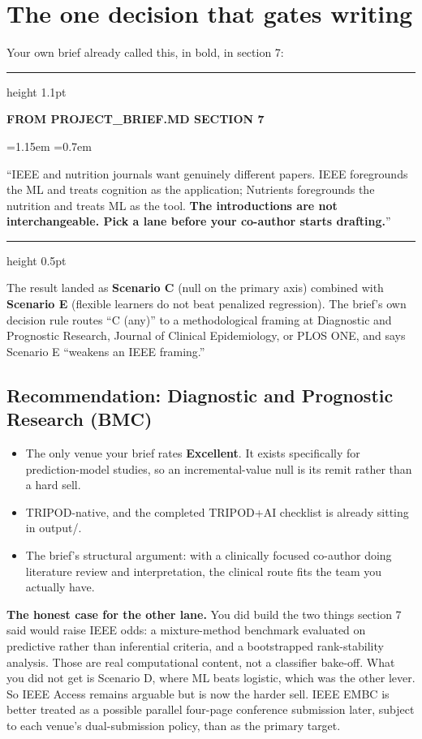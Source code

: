 \documentclass[11pt]{article}
\newcommand{\lbl}[1]{{\sffamily\footnotesize\bfseries\color{muted}\MakeUppercase{#1}}}
\newcommand{\num}[1]{{\ttfamily #1}}
\newenvironment{callout}[1]{%
  \par\medskip
  {\color{accent}\hrule height 1.1pt}
  \vspace{7pt}
  \lbl{#1}\par\vspace{2pt}
  \begingroup\leftskip=1.15em \rightskip=0.7em
}{%
  \par\endgroup
  \vspace{7pt}
  {\color{rule}\hrule height 0.5pt}
  \par\medskip
}
\begin{document}
\section{The one decision that gates writing}

Your own brief already called this, in bold, in section 7:

\begin{callout}{From PROJECT\_BRIEF.md section 7}
``IEEE and nutrition journals want genuinely different papers. IEEE foregrounds the ML and treats cognition as the application; Nutrients foregrounds the nutrition and treats ML as the tool. \textbf{The introductions are not interchangeable. Pick a lane before your co-author starts drafting.}''
\end{callout}

The result landed as \textbf{Scenario C} (null on the primary axis) combined with \textbf{Scenario E} (flexible learners do not beat penalized regression). The brief's own decision rule routes ``C (any)'' to a methodological framing at Diagnostic and Prognostic Research, Journal of Clinical Epidemiology, or PLOS ONE, and says Scenario E ``weakens an IEEE framing.''

\subsection*{Recommendation: Diagnostic and Prognostic Research (BMC)}

\begin{itemize}[leftmargin=1.2em,itemsep=3pt,topsep=4pt]
\item The only venue your brief rates \textbf{Excellent}. It exists specifically for prediction-model studies, so an incremental-value null is its remit rather than a hard sell.
\item TRIPOD-native, and the completed TRIPOD+AI checklist is already sitting in \num{output/}.
\item The brief's structural argument: with a clinically focused co-author doing literature review and interpretation, the clinical route fits the team you actually have.
\end{itemize}

\textbf{The honest case for the other lane.} You did build the two things section 7 said would raise IEEE odds: a mixture-method benchmark evaluated on predictive rather than inferential criteria, and a bootstrapped rank-stability analysis. Those are real computational content, not a classifier bake-off. What you did not get is Scenario D, where ML beats logistic, which was the other lever. So IEEE Access remains arguable but is now the harder sell. IEEE EMBC is better treated as a possible parallel four-page conference submission later, subject to each venue's dual-submission policy, than as the primary target.
\end{document}
